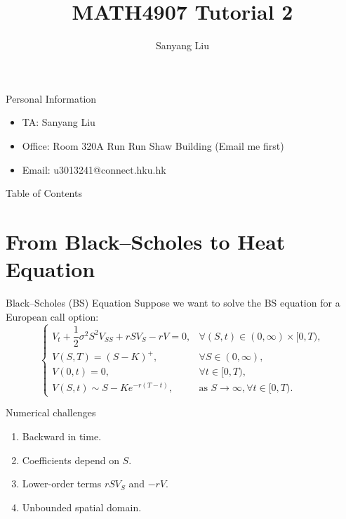 \documentclass{beamer}
\title{MATH4907 Tutorial 2}
\author{Sanyang Liu}
\begin{document}
\maketitle

\begin{frame}{Personal Information}
\begin{itemize}
    \item TA: Sanyang Liu
    \item Office: Room 320A Run Run Shaw Building (Email me first)
    \item Email: u3013241@connect.hku.hk
\end{itemize}
\end{frame}

\begin{frame}{Table of Contents}
    \tableofcontents[]
\end{frame}

\section[A2Q1]{From Black--Scholes to Heat Equation}

\begin{frame}{Black--Scholes (BS) Equation}
Suppose we want to solve the BS equation for a European call option:
\[
\begin{cases}
V_t+\dfrac{1}{2}\sigma^2S^2V_{SS}
+rSV_S-rV=0,
& \forall (S,t)\in(0,\infty)\times[0,T),\\[0.25cm]
V(S,T)=(S-K)^+,
& \forall S\in(0,\infty),\\[0.25cm]
V(0,t)=0,
& \forall t\in[0,T),\\[0.25cm]
V(S,t)\sim S-Ke^{-r(T-t)},
& \text{as } S\to\infty,   \forall t\in[0,T).
\end{cases}
\]
\begin{block}{Numerical challenges}
\begin{enumerate}
    \item Backward in time.
    \item Coefficients depend on \(S\).
    \item Lower-order terms \(rSV_S\) and \(-rV\).
    \item Unbounded spatial domain.
\end{enumerate}
\end{block}
\end{frame}
\end{document}
